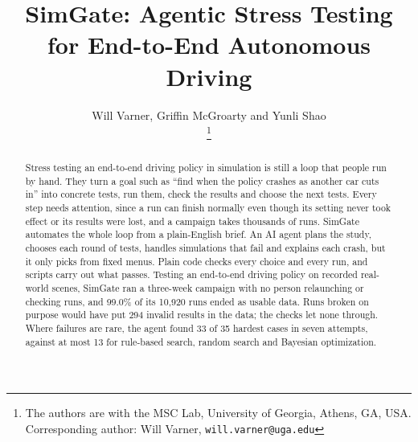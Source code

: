 \documentclass[conference]{IEEEtran}
\newcommand{\guide}[1]{}
\begin{document}

\title{\LARGE \bf SimGate: Agentic Stress Testing\\for End-to-End Autonomous Driving}

\author{
    \parbox{\textwidth}{%
        \centering
        Will Varner, Griffin McGroarty and Yunli Shao%
    }%
    \thanks{The authors are with the MSC Lab, University of Georgia, Athens, GA, USA.
        Corresponding author: Will Varner, {\tt\small will.varner@uga.edu}}%
}

\maketitle
\thispagestyle{empty}
\pagestyle{empty}

\begin{abstract}
\guide{About 150 words, written last, with the final numbers. Four sentences: (1) the problem: stress testing an end-to-end driving policy in closed loop takes thousands of runs; by hand it is slow, and left unattended it fails silently; (2) what SimGate is: an AI agent that runs the whole campaign, choosing only from fixed menus that code checks and scripts carry out; (3) the evidence: the scale of the unattended campaign, the share of failed launches healed with no person, and that no planted invalid run was kept; (4) the main finding: where failures are rare, letting the agent choose the next tests confirms the hardest cases sooner than rules, random search or Optuna.}
Stress testing an end-to-end driving policy in simulation is still a loop that people run by hand. They turn a goal such as ``find when the policy crashes as another car cuts in'' into concrete tests, run them, check the results and choose the next tests. Every step needs attention, since a run can finish normally even though its setting never took effect or its results were lost, and a campaign takes thousands of runs. SimGate automates the whole loop from a plain-English brief. An AI agent plans the study, chooses each round of tests, handles simulations that fail and explains each crash, but it only picks from fixed menus. Plain code checks every choice and every run, and scripts carry out what passes. Testing an end-to-end driving policy on recorded real-world scenes, SimGate ran a three-week campaign with no person relaunching or checking runs, and 99.0\% of its 10,920 runs ended as usable data. Runs broken on purpose would have put 294 invalid results in the data; the checks let none through. Where failures are rare, the agent found 33 of 35 hardest cases in seven attempts, against at most 13 for rule-based search, random search and Bayesian optimization.
\end{abstract}
\end{document}
